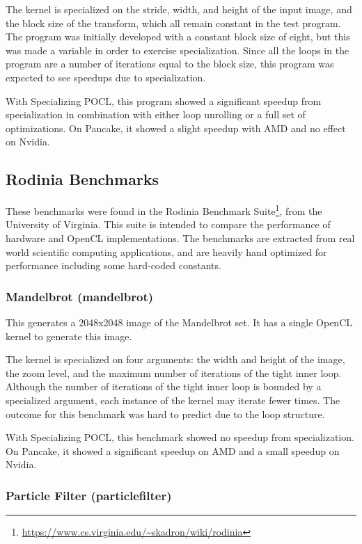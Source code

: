 \documentclass{acm_proc_article-sp}
\begin{document}
The kernel is specialized on the stride, width, and height of the input image,
and the block size of the transform, which all remain constant in the test
program. The program was initially developed with a constant block size of
eight, but this was made a variable in order to exercise specialization. Since
all the loops in the program are a number of iterations equal to the block size,
this program was expected to see speedups due to specialization.

With Specializing POCL, this program showed a significant speedup from
specialization in combination with either loop unrolling or a full set of
optimizations. On Pancake, it showed a slight speedup with AMD and no effect on
Nvidia.

\subsection{Rodinia Benchmarks}

These benchmarks were found in the Rodinia Benchmark
Suite\footnote{\url{https://www.cs.virginia.edu/~skadron/wiki/rodinia}}, from
the University of Virginia. This suite is intended to compare the performance
of hardware and OpenCL implementations. The benchmarks are extracted from real
world scientific computing applications, and are heavily hand optimized for
performance including some hard-coded constants.

\subsubsection{Mandelbrot (mandelbrot)}

This generates a 2048x2048 image of the Mandelbrot set. It has a single OpenCL
kernel to generate this image.

The kernel is specialized on four arguments: the width and height of the image,
the zoom level, and the maximum number of iterations of the tight inner loop.
Although the number of iterations of the tight inner loop is bounded by a
specialized argument, each instance of the kernel may iterate fewer times. The
outcome for this benchmark was hard to predict due to the loop structure.

With Specializing POCL, this benchmark showed no speedup from specialization.
On Pancake, it showed a significant speedup on AMD and a small speedup on
Nvidia.

\subsubsection{Particle Filter (particlefilter)}
\end{document}
